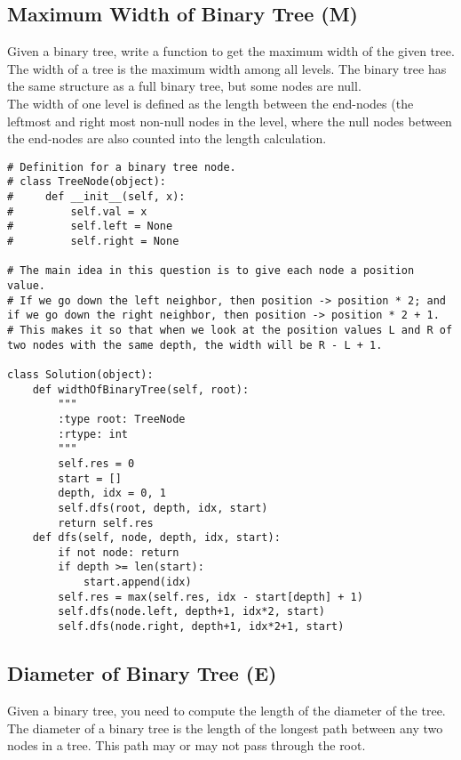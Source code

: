 \subsection{Maximum Width of Binary Tree (M)}
Given a binary tree, write a function to get the maximum width of the given tree. The width of a tree is the maximum width among all levels. The binary tree has the same structure as a full binary tree, but some nodes are null.\\

The width of one level is defined as the length between the end-nodes (the leftmost and right most non-null nodes in the level, where the null nodes between the end-nodes are also counted into the length calculation.\\

\begin{lstlisting}
# Definition for a binary tree node.
# class TreeNode(object):
#     def __init__(self, x):
#         self.val = x
#         self.left = None
#         self.right = None

# The main idea in this question is to give each node a position value. 
# If we go down the left neighbor, then position -> position * 2; and if we go down the right neighbor, then position -> position * 2 + 1. 
# This makes it so that when we look at the position values L and R of two nodes with the same depth, the width will be R - L + 1.

class Solution(object):
    def widthOfBinaryTree(self, root):
        """
        :type root: TreeNode
        :rtype: int
        """
        self.res = 0
        start = []
        depth, idx = 0, 1
        self.dfs(root, depth, idx, start)
        return self.res
    def dfs(self, node, depth, idx, start):
        if not node: return
        if depth >= len(start):
            start.append(idx)
        self.res = max(self.res, idx - start[depth] + 1)
        self.dfs(node.left, depth+1, idx*2, start)
        self.dfs(node.right, depth+1, idx*2+1, start)
\end{lstlisting}


\subsection{Diameter of Binary Tree (E)}
Given a binary tree, you need to compute the length of the diameter of the tree. The diameter of a binary tree is the length of the longest path between any two nodes in a tree. This path may or may not pass through the root. \\

